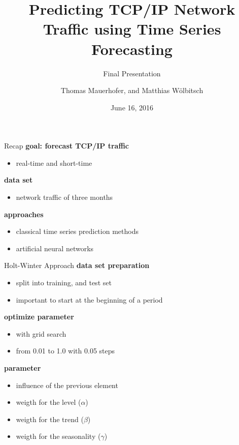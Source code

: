 \documentclass{beamer}
\title{Predicting TCP/IP Network Traffic using Time Series Forecasting}
\subtitle{Final Presentation}
\date{June 16, 2016}
\author{Thomas Mauerhofer, and Matthias Wölbitsch}
\begin{document}
  \maketitle
  
  \begin{frame}{Recap}   
    \textbf{goal: forecast TCP/IP traffic}
    \begin{itemize}
     \item real-time and short-time
    \end{itemize}
    
    \textbf{data set}
    \begin{itemize}
     \item network traffic of three months
    \end{itemize}
    
    \textbf{approaches}
    \begin{itemize}
     \item classical time series prediction methods
     \item artificial neural networks
    \end{itemize}
  \end{frame}
  
  \begin{frame}{Holt-Winter Approach}
    \textbf{data set preparation}
    \begin{itemize}
      \item split into training, and test set
      \item important to start at the beginning of a period
    \end{itemize}
    
    \textbf{optimize parameter}
    \begin{itemize}
     \item with grid search
     \item from 0.01 to 1.0 with 0.05 steps
    \end{itemize}
    
    \textbf{parameter}
    \begin{itemize}
      \item influence of the previous element
      \item weigth for the level ($\alpha$)
      \item weigth for the trend ($\beta$)
      \item weigth for the seasonality ($\gamma$)
    \end{itemize}
  \end{frame}
  
\end{document}
